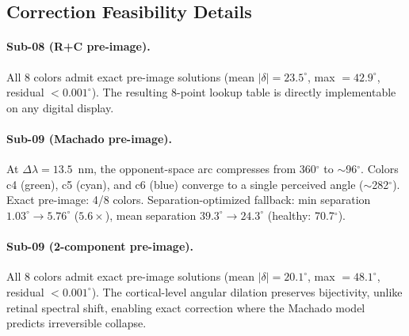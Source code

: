 \documentclass{article}
\begin{document}
\subsection{Correction Feasibility Details}

\paragraph{Sub-08 (R+C pre-image).}
All 8 colors admit exact pre-image solutions (mean $|\delta| = 23.5^\circ$, max $= 42.9^\circ$, residual $< 0.001^\circ$).
The resulting 8-point lookup table is directly implementable on any digital display.

\paragraph{Sub-09 (Machado pre-image).}
At $\Delta\lambda = 13.5$~nm, the opponent-space arc compresses from 360$^\circ$ to $\sim$96$^\circ$.
Colors c4 (green), c5 (cyan), and c6 (blue) converge to a single perceived angle ($\sim$282$^\circ$).
Exact pre-image: 4/8 colors.
Separation-optimized fallback: min separation $1.03^\circ \to 5.76^\circ$ ($5.6\times$), mean separation $39.3^\circ \to 24.3^\circ$ (healthy: 70.7$^\circ$).

\paragraph{Sub-09 (2-component pre-image).}
All 8 colors admit exact pre-image solutions (mean $|\delta| = 20.1^\circ$, max $= 48.1^\circ$, residual $< 0.001^\circ$).
The cortical-level angular dilation preserves bijectivity, unlike retinal spectral shift, enabling exact correction where the Machado model predicts irreversible collapse.
\end{document}
